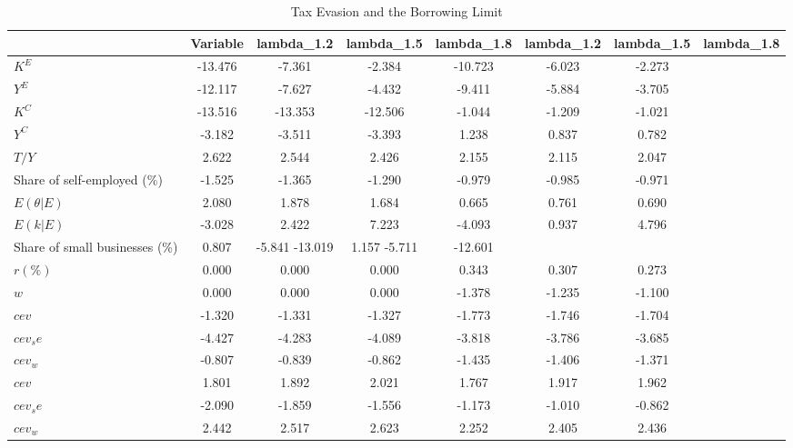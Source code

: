 \begin{sidewaystable}[htbp] \centering 
\caption{Tax Evasion and the Borrowing Limit} 
\label{table: alevcreditconstr} 
\begin{tabular}{l c c c c c c} \hline 
& Variable & lambda_1.2  & lambda_1.5 & lambda_1.8 & lambda_1.2 & lambda_1.5 &lambda_1.8  \\ 
\hline \hline 
$K^{E}$    &  -13.476 &   -7.361 &   -2.384 &  -10.723&   -6.023 &   -2.273 \\ 
$Y^{E}$    &  -12.117 &   -7.627 &   -4.432 &   -9.411&   -5.884 &   -3.705 \\ 
$K^{C}$    &  -13.516 &  -13.353 &  -12.506 &   -1.044&   -1.209 &   -1.021 \\ 
$Y^{C}$    &   -3.182 &   -3.511 &   -3.393 &    1.238&    0.837 &    0.782 \\ 
$T/Y$    &    2.622 &    2.544 &    2.426 &    2.155&    2.115 &    2.047 \\ 
Share of self-employed (\%)&   -1.525 &   -1.365 &   -1.290 &   -0.979&   -0.985 &   -0.971 \\ 
$E(\theta|E)$ &    2.080 &    1.878 &    1.684 &    0.665 &    0.761 &    0.690\\ 
$E(k|E)$       &   -3.028 &    2.422 &    7.223 &   -4.093 &    0.937 &    4.796 \\ 
Share of small businesses (\%)&    0.807 &   -5.841  -13.019 &    1.157  -5.711 &  -12.601 \\ 
$r(\%)$          &    0.000 &    0.000 &    0.000 &    0.343&    0.307 &    0.273 \\ 
$w$                &    0.000 &    0.000 &    0.000 &   -1.378&   -1.235 &   -1.100 \\ 
$cev$                &   -1.320 &   -1.331 &   -1.327 &   -1.773&   -1.746 &   -1.704 \\ 
$cev_se$                &   -4.427 &   -4.283 &   -4.089 &   -3.818&   -3.786 &   -3.685 \\ 
$cev_w$                &   -0.807 &   -0.839 &   -0.862 &   -1.435&   -1.406 &   -1.371 \\ 
$cev$                &    1.801 &    1.892 &    2.021 &    1.767&    1.917 &    1.962 \\ 
$cev_se$                &   -2.090 &   -1.859 &   -1.556 &   -1.173&   -1.010 &   -0.862 \\ 
$cev_w$                &    2.442 &    2.517 &    2.623 &    2.252&    2.405 &    2.436 \\ 
\hline  
 \end{tabular} 
\end{sidewaystable} 
